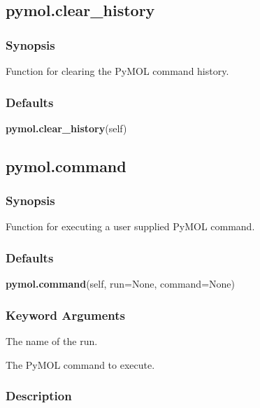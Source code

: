   

 \newpage 

 \subsection{pymol.clear\_history} 

  
 \subsubsection{Synopsis} 

 Function for clearing the PyMOL command history. 
  

  
 \subsubsection{Defaults} 

 \textsf{\textbf{pymol.clear\_history}(self)} 

  

 \newpage 

 \subsection{pymol.command} 

  
 \subsubsection{Synopsis} 

 Function for executing a user supplied PyMOL command. 
  

  
 \subsubsection{Defaults} 

 \textsf{\textbf{pymol.command}(self, run=None, command=None)} 

  
 \subsubsection{Keyword Arguments} 

   The name of the run.   

   The PyMOL command to execute.  

  

  
 \subsubsection{Description} 

